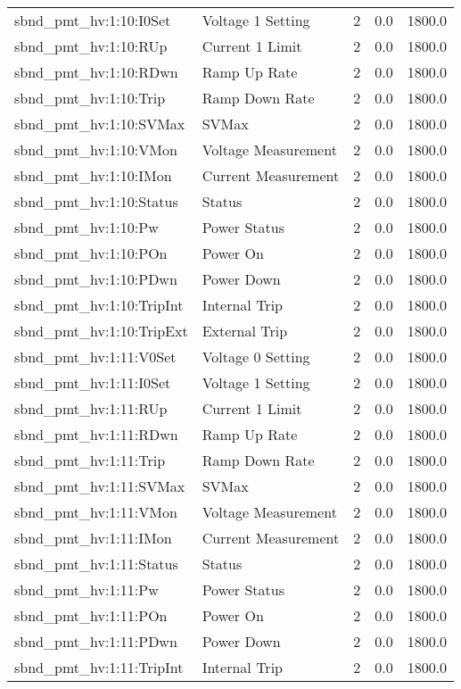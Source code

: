 \begin{center}
\begin{longtable}{l | l l l l }
sbnd\_pmt\_hv:1:10:I0Set & Voltage 1 Setting & 2 & 0.0 & 1800.0\\ 
sbnd\_pmt\_hv:1:10:RUp & Current 1 Limit & 2 & 0.0 & 1800.0\\ 
sbnd\_pmt\_hv:1:10:RDwn & Ramp Up Rate & 2 & 0.0 & 1800.0\\ 
sbnd\_pmt\_hv:1:10:Trip & Ramp Down Rate & 2 & 0.0 & 1800.0\\ 
sbnd\_pmt\_hv:1:10:SVMax & SVMax & 2 & 0.0 & 1800.0\\ 
sbnd\_pmt\_hv:1:10:VMon & Voltage Measurement & 2 & 0.0 & 1800.0\\ 
sbnd\_pmt\_hv:1:10:IMon & Current Measurement & 2 & 0.0 & 1800.0\\ 
sbnd\_pmt\_hv:1:10:Status & Status & 2 & 0.0 & 1800.0\\ 
sbnd\_pmt\_hv:1:10:Pw & Power Status & 2 & 0.0 & 1800.0\\ 
sbnd\_pmt\_hv:1:10:POn & Power On & 2 & 0.0 & 1800.0\\ 
sbnd\_pmt\_hv:1:10:PDwn & Power Down & 2 & 0.0 & 1800.0\\ 
sbnd\_pmt\_hv:1:10:TripInt & Internal Trip & 2 & 0.0 & 1800.0\\ 
sbnd\_pmt\_hv:1:10:TripExt & External Trip & 2 & 0.0 & 1800.0\\ 
sbnd\_pmt\_hv:1:11:V0Set & Voltage 0 Setting & 2 & 0.0 & 1800.0\\ 
sbnd\_pmt\_hv:1:11:I0Set & Voltage 1 Setting & 2 & 0.0 & 1800.0\\ 
sbnd\_pmt\_hv:1:11:RUp & Current 1 Limit & 2 & 0.0 & 1800.0\\ 
sbnd\_pmt\_hv:1:11:RDwn & Ramp Up Rate & 2 & 0.0 & 1800.0\\ 
sbnd\_pmt\_hv:1:11:Trip & Ramp Down Rate & 2 & 0.0 & 1800.0\\ 
sbnd\_pmt\_hv:1:11:SVMax & SVMax & 2 & 0.0 & 1800.0\\ 
sbnd\_pmt\_hv:1:11:VMon & Voltage Measurement & 2 & 0.0 & 1800.0\\ 
sbnd\_pmt\_hv:1:11:IMon & Current Measurement & 2 & 0.0 & 1800.0\\ 
sbnd\_pmt\_hv:1:11:Status & Status & 2 & 0.0 & 1800.0\\ 
sbnd\_pmt\_hv:1:11:Pw & Power Status & 2 & 0.0 & 1800.0\\ 
sbnd\_pmt\_hv:1:11:POn & Power On & 2 & 0.0 & 1800.0\\ 
sbnd\_pmt\_hv:1:11:PDwn & Power Down & 2 & 0.0 & 1800.0\\ 
sbnd\_pmt\_hv:1:11:TripInt & Internal Trip & 2 & 0.0 & 1800.0\\ 

\end{longtable}
\end{center}
